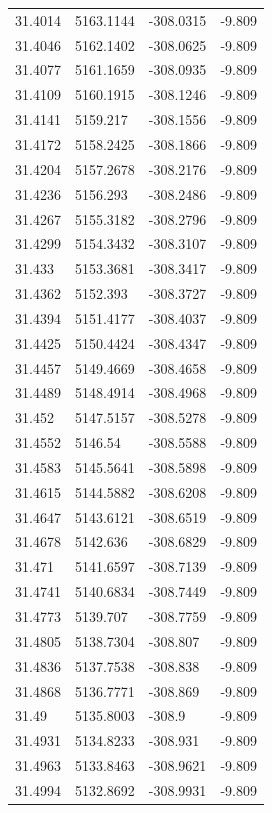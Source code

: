 \begin{table}[H]
\begin{tabular}{llll}
31.4014 & 5163.1144 & -308.0315 & -9.809 \\
31.4046 & 5162.1402 & -308.0625 & -9.809 \\
31.4077 & 5161.1659 & -308.0935 & -9.809 \\
31.4109 & 5160.1915 & -308.1246 & -9.809 \\
31.4141 & 5159.217 & -308.1556 & -9.809 \\
31.4172 & 5158.2425 & -308.1866 & -9.809 \\
31.4204 & 5157.2678 & -308.2176 & -9.809 \\
31.4236 & 5156.293 & -308.2486 & -9.809 \\
31.4267 & 5155.3182 & -308.2796 & -9.809 \\
31.4299 & 5154.3432 & -308.3107 & -9.809 \\
31.433 & 5153.3681 & -308.3417 & -9.809 \\
31.4362 & 5152.393 & -308.3727 & -9.809 \\
31.4394 & 5151.4177 & -308.4037 & -9.809 \\
31.4425 & 5150.4424 & -308.4347 & -9.809 \\
31.4457 & 5149.4669 & -308.4658 & -9.809 \\
31.4489 & 5148.4914 & -308.4968 & -9.809 \\
31.452 & 5147.5157 & -308.5278 & -9.809 \\
31.4552 & 5146.54 & -308.5588 & -9.809 \\
31.4583 & 5145.5641 & -308.5898 & -9.809 \\
31.4615 & 5144.5882 & -308.6208 & -9.809 \\
31.4647 & 5143.6121 & -308.6519 & -9.809 \\
31.4678 & 5142.636 & -308.6829 & -9.809 \\
31.471 & 5141.6597 & -308.7139 & -9.809 \\
31.4741 & 5140.6834 & -308.7449 & -9.809 \\
31.4773 & 5139.707 & -308.7759 & -9.809 \\
31.4805 & 5138.7304 & -308.807 & -9.809 \\
31.4836 & 5137.7538 & -308.838 & -9.809 \\
31.4868 & 5136.7771 & -308.869 & -9.809 \\
31.49 & 5135.8003 & -308.9 & -9.809 \\
31.4931 & 5134.8233 & -308.931 & -9.809 \\
31.4963 & 5133.8463 & -308.9621 & -9.809 \\
31.4994 & 5132.8692 & -308.9931 & -9.809 \\

\end{tabular}
\end{table}
